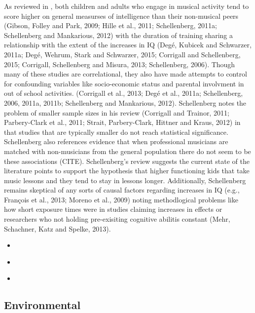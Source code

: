 \documentclass[]{book}
\providecommand{\tightlist}{%
  \setlength{\itemsep}{0pt}\setlength{\parskip}{0pt}}
\begin{document}
As reviewed in \citet{schellenbergMusicNonmusicalAbilities2017}, both children and adults who engage in musical activity tend to score higher on general measurses of intelligence than their non-musical peers (Gibson, Folley and Park, 2009; Hille et al., 2011; Schellenberg, 2011a; Schellenberg and Mankarious, 2012) with the duration of training sharing a relationship with the extent of the increases in IQ (Degé, Kubicek and Schwarzer, 2011a; Degé, Wehrum, Stark and Schwarzer, 2015; Corrigall and Schellenberg, 2015; Corrigall, Schellenberg and Misura, 2013; Schellenberg, 2006).
Though many of these studies are correlational, they also have made attempts to control for confounding variables like socio-economic status and parental involvment in out of school activities. (Corrigall et al., 2013; Degé et al., 2011a; Schellenberg, 2006, 2011a, 2011b; Schellenberg and Mankarious, 2012).
Schellenberg notes the problem of smaller sample sizes in his review (Corrigall and Trainor, 2011; Parbery-Clark et al., 2011; Strait, Parbery-Clark, Hittner and Kraus, 2012) in that studies that are typically smaller do not reach statistical significance.
Schellenberg also references evidence that when professional musicians are matched with non-musicians from the general population there do not seem to be these associations (CITE).
Schellenberg's review suggests the current state of the literature points to support the hypothesis that higher functioning kids that take music lessons and they tend to stay in lessons longer.
Additionally, Schellenberg remains skeptical of any sorts of causal factors regarding increases in IQ (e.g., François et al., 2013; Moreno et al., 2009) noting methodlogical problems like how short exposure times were in studies claiming increases in effects or researchers who not holding pre-exisiting cognitive abilitis constant (Mehr, Schachner, Katz and Spelke, 2013).

\begin{itemize}
\tightlist
\item
  \citep{corrigallMusicTrainingCognition2013}
\item
  \citep{corrigallMusicTrainingCognition2013a}
\item
  \citep{swaminathanRevisitingAssociationMusic2017}
\end{itemize}

\hypertarget{environmental}{%
\subsection{Environmental}\label{environmental}}
\end{document}
